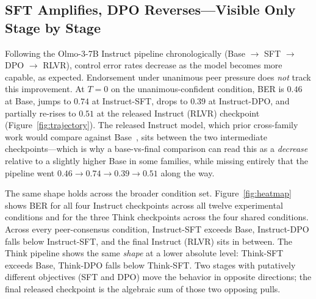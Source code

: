 \documentclass[11pt]{article}
\begin{document}
\subsection{SFT Amplifies, DPO Reverses---Visible Only Stage by Stage}
\label{sec:stage_decomp}

\noindent Following the Olmo-3-7B Instruct pipeline chronologically (Base $\to$ SFT $\to$ DPO $\to$ RLVR), control error rates decrease as the model becomes more capable, as expected. Endorsement under unanimous peer pressure does \emph{not} track this improvement. At $T{=}0$ on the unanimous-confident condition, BER is $0.46$ at Base, jumps to $0.74$ at Instruct-SFT, drops to $0.39$ at Instruct-DPO, and partially re-rises to $0.51$ at the released Instruct (RLVR) checkpoint (Figure~\ref{fig:trajectory}). The released Instruct model, which prior cross-family work would compare against Base~\citep{zhu2025conformity}, sits between the two intermediate checkpoints---which is why a base-vs-final comparison can read this as a \emph{decrease} relative to a slightly higher Base in some families, while missing entirely that the pipeline went $0.46 \to 0.74 \to 0.39 \to 0.51$ along the way.

The same shape holds across the broader condition set. Figure~\ref{fig:heatmap} shows BER for all four Instruct checkpoints across all twelve experimental conditions and for the three Think checkpoints across the four shared conditions. Across every peer-consensus condition, Instruct-SFT exceeds Base, Instruct-DPO falls below Instruct-SFT, and the final Instruct (RLVR) sits in between. The Think pipeline shows the same \emph{shape} at a lower absolute level: Think-SFT exceeds Base, Think-DPO falls below Think-SFT. Two stages with putatively different objectives (SFT and DPO) move the behavior in opposite directions; the final released checkpoint is the algebraic sum of those two opposing pulls.
\end{document}

